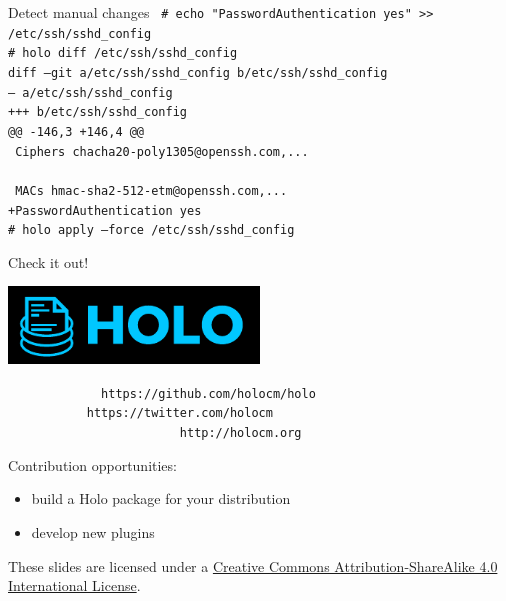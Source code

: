 \documentclass{beamer}
\begin{document}
\begin{frame}[plain,c]{Detect manual changes}
 \small\texttt{%
  {\color{holoonblack}\#} echo "PasswordAuthentication yes" >> /etc/ssh/sshd\_config\\[0.5em]
  {\color{holoonblack}\#} holo diff /etc/ssh/sshd\_config\\
  diff --git a/etc/ssh/sshd\_config b/etc/ssh/sshd\_config\\
  --- a/etc/ssh/sshd\_config\\
  +++ b/etc/ssh/sshd\_config\\
  @@ -146,3 +146,4 @@\\
  ~Ciphers~chacha20-poly1305@openssh.com,...\\
  ~\\
  ~MACs~hmac-sha2-512-etm@openssh.com,...\\
  +PasswordAuthentication yes\\[0.5em]
  {\color{holoonblack}\#} holo apply --force /etc/ssh/sshd\_config
 }
\end{frame}

\begin{frame}[plain,c]{Check it out!}
 \vspace*{2.5em}
 \begin{center}
  \includegraphics[width=0.5\textwidth]{holo-logo.pdf}
 \end{center}

 \texttt{%
  ~~~~~~~~~~~~https://github.com/{\color{holoonblack}holocm}/holo\\
  ~~~~~~~~~~~https://twitter.com/{\color{holoonblack}holocm}\\
  ~~~~~~~~~~~~~~~~~~~~~~~~http://{\color{holoonblack}holocm}.org
 }

 \vspace{3em}
 \small Contribution opportunities:
 \begin{itemize}
  \item build a Holo package for your distribution
  \item develop new plugins
 \end{itemize}
 \vspace*{2em}
 \begin{center}
  \tiny These slides are licensed under a \href{https://creativecommons.org/licenses/by-sa/4.0/}{\color{holoonblack}Creative Commons Attribution-ShareAlike 4.0 International License}.
 \end{center}
\end{frame}
\end{document}

